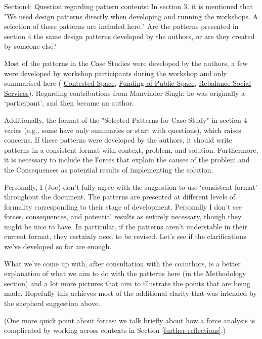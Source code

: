 \documentclass[acmlarge,timestamp]{acmart}
\begin{document}
\begin{leftbubbles}
\label{Q:developed-by-authors} Section4: Question regarding pattern contents: In section 3, it is mentioned that "We used design patterns directly when developing and running the workshops. A selection of these patterns are included here." Are the patterns presented in section 4 the same design patterns developed by the authors, or are they created by someone else?
\end{leftbubbles}
\begin{rightbubbles}
Most of the patterns in the Case Studies were developed by the
authors, a few were developed by workshop participants during the
workshop and only summarised here ({\sc
  \hyperref[pat:contested-space]{Contested Space}}, {\sc
  \hyperref[pat:funding-of-public-space]{Funding of Public Space}},
{\sc \hyperref[{pat:rebalance-social-services}]{Rebalance Social
    Services}}).  Regarding contributions from Manvinder Singh: he was
originally a ‘participant’, and then became an author.
\end{rightbubbles}

\begin{leftbubbles}
Additionally, the format of the "Selected Patterns for Case Study" in
section 4 varies (e.g., some have only summaries or start with
questions), which raises concerns. If these patterns were developed by
the authors, it should write patterns in a consistent format with
context, problem, and solution. Furthermore, it is necessary to
include the Forces that explain the causes of the problem and the
Consequences as potential results of implementing the solution.
\end{leftbubbles}

\begin{rightbubbles}
Personally, I (Joe) don’t fully agree with the suggestion to use
‘consistent format’ throughout the document.  The patterns are
presented at different levels of formality corresponding to their
stage of development.  Personally I don’t see forces, consequences,
and potential results as entirely necessary, though they might be nice
to have.  In particular, if the patterns aren’t understable in their
current format, they certainly need to be revised.  Let’s see if the
clarifications we’ve developed so far are enough.

What we’ve come up with, after consultation with the coauthors, is a
better explanation of what we aim to do with the patterns here (in the
Methodology section) and a lot more pictures that aim to illustrate
the points that are being made.  Hopefully this achieves most of the
additional clarity that was intended by the shepherd suggestion above.

(One more quick point about forces: we talk briefly about how a force
analysis is complicated by working across contexts in Section
\ref{further-reflections}.)
\end{rightbubbles}
\end{document}
